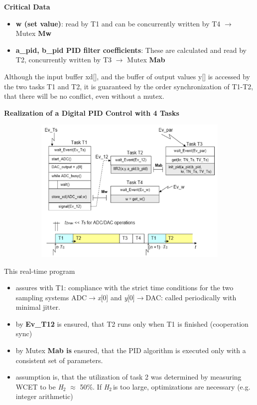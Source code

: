 {\rot\bf Critical Data}

\begin{itemize}
\item \textbf{ w (set value)}: read by T1 and can be concurrently written by T4 $\rightarrow$ Mutex \textbf{Mw}

\item \textbf{ a\_pid, b\_pid PID filter coefficients}: These are calculated and read by T2, concurrently written by T3  $\rightarrow$ Mutex \textbf{Mab}
\end{itemize}

Although the input buffer xd[], and the buffer of output values y[] is accessed by the two tasks T1 and T2, it is guaranteed by the order synchronization of T1-T2, that there will be no conflict, even without a mutex.\\
\newpage

{\rot\bf  Realization of a Digital PID Control with 4 Tasks}

	\begin{figure}[h]
    \centering
    \includegraphics[width=13cm, height=7cm]{Images/image154.png}
    \label{fig:Fig }
    \end{figure}

This real-time program 

\begin{itemize}
\item  assures with T1: compliance with the strict time conditions for the two sampling systems ADC$\rightarrow$\textit{x}[0] and \textit{y}[0]$\rightarrow$DAC: called periodically with minimal jitter.

\item  by \textbf{Ev\_T12} is ensured, that T2 runs only when T1 is finished (cooperation sync)

\item  by Mutex \textbf{Mab is} ensured, that the PID algorithm is executed only with a consistent set of parameters.

\item  assumption is, that the utilization of task 2 was determined by measuring WCET to be \textit{H}${}_{2}$ $\mathrm{\approx}$ 50\%. If \textit{H}${}_{2\ }$is too large, optimizations are necessary (e.g. integer arithmetic) 
\end{itemize}

